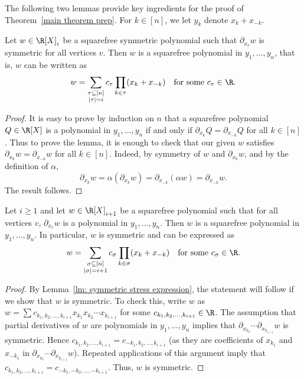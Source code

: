The following two lemmas provide key ingredients for the proof of Theorem~\ref{main theorem prep}. For $k\in [n]$, we let $y_k$ denote $x_k+x_{-k}$.

\begin{lemma}\label{lm: symmetric stress expression}
Let $w \in \R[X]_i$ be a squarefree symmetric polynomial such that $\partial_{x_v} w$ is symmetric for all vertices $v$. Then $w$ is a squarefree polynomial in $y_1,\ldots,y_n$, that is, $w$ can be written as $$w=\sum_{\substack{\tau\subseteq [n]\\|\tau|=i}} c_\tau \prod_{k\in \tau} (x_k+x_{-k}) \quad \mbox{for some $c_\tau\in \R$}.$$ 
\end{lemma}
\begin{proof}
 It is easy to prove by induction on $n$ that a squarefree polynomial $Q\in\R[X]$ is a polynomial in $y_1,\ldots,y_n$ if and only if $\partial_{x_{k}}Q=\partial_{x_{-k}}Q$ for all $k\in [n]$. Thus 
to prove the lemma, it is enough to check that our given $w$ satisfies $\partial_{x_{k}}w=\partial_{x_{-k}}w$ for all $k\in [n]$. Indeed, by symmetry of $w$ and $\partial_{x_k} w$, and by the definition of $\alpha$,
\[ 
\partial_{x_{k}}w=\alpha(\partial_{x_{k}}w)=\partial_{x_{-k}} (\alpha w)=\partial_{x_{-k}} w.
\]
The result follows.
\end{proof}


\begin{lemma}\label{lm: i-stress to i+1-stress}
Let $i\geq 1$ and let $w\in \R[X]_{i+1}$ be a squarefree polynomial such that for all vertices $v$, $\partial_{x_v} w$ is a polynomial in $y_1,\ldots,y_n$. Then $w$ is a squarefree polynomial in $y_1,\ldots,y_n$. In particular, $w$ is symmetric and can be expressed as $$w=\sum_{\substack{\sigma\subseteq [n]\\|\sigma|=i+1}} c_\sigma \prod_{k\in \sigma} (x_k+x_{-k}) \quad \mbox{for some }c_\sigma\in\R.$$
\end{lemma}
\begin{proof}
By Lemma~\ref{lm: symmetric stress expression}, the statement will follow if we show that $w$ is symmetric. To check this, write $w$ as $w=\sum c_{k_1,k_2,\ldots,k_{i+1}} x_{k_1}x_{k_2}\cdots x_{k_{i+1}}$ for some $c_{k_1,k_2,\ldots,k_{i+1}}\in \R$. The assumption that partial derivatives of $w$ are polynomials in $y_1,\ldots,y_n$ implies that $\partial_{x_{k_2}}\cdots \partial_{x_{k_{i+1}}} w$ is symmetric. Hence $c_{k_1,k_2,\ldots,k_{i+1}}= c_{-k_1,k_2,\ldots,k_{i+1}}$ (as they are coefficients of $x_{k_1}$ and $x_{-k_1}$ in $\partial_{x_{k_2}}\cdots \partial_{x_{k_{i+1}}} w$). Repeated applications of this argument imply that $c_{k_1,k_2,\ldots,k_{i+1}}= c_{-k_1,-k_2,\ldots,-k_{i+1}}$. Thus, $w$ is symmetric.
\end{proof}
